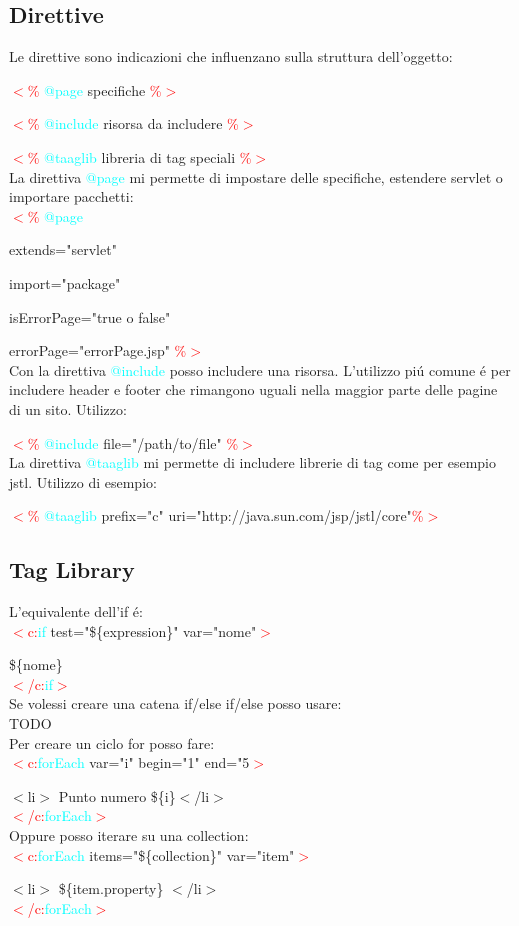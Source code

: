 \documentclass[11pt, letterpaper, titlepage]{article}
\newcommand{\openab}{\textcolor{red}{$<$\%} }
\newcommand{\closeab}{\textcolor{red}{\%$>$} }
\newcommand{\opencb}[1]{\textcolor{red}{$<$c:}\textcolor{cyan}{#1} }
\newcommand{\closecb}{\textcolor{red}{$>$}}
\newcommand{\closect}[1]{\textcolor{red}{$<$/c:}\textcolor{cyan}{#1}\textcolor{red}{$>$}}
\begin{document}
\subsection{Direttive}
Le direttive sono indicazioni che influenzano sulla struttura dell'oggetto:\par
\openab\textcolor{cyan}{@page} specifiche \closeab\par
\openab\textcolor{cyan}{@include} risorsa da includere \closeab \par
\openab\textcolor{cyan}{@taaglib} libreria di tag speciali \closeab \\
La direttiva \textcolor{cyan}{@page} mi permette di impostare delle specifiche, estendere
servlet o importare pacchetti:\\
\openab\textcolor{cyan}{@page}\par
extends="servlet"\par
import="package"\par
isErrorPage="true o false"\par
errorPage="errorPage.jsp" \closeab\\
Con la direttiva \textcolor{cyan}{@include} posso includere una risorsa. L'utilizzo pi\'u
comune \'e per includere header e footer che rimangono uguali nella maggior parte delle
pagine di un sito. Utilizzo:\par
\openab\textcolor{cyan}{@include} file="/path/to/file" \closeab \\
La direttiva \textcolor{cyan}{@taaglib} mi permette di includere librerie di tag come per
esempio jstl. Utilizzo di esempio:\par
\openab\textcolor{cyan}{@taaglib} prefix="c" uri="http://java.sun.com/jsp/jstl/core"\closeab

\subsection{Tag Library}
L'equivalente dell'if \'e:\\
\opencb{if}test="\$\{expression\}" var="nome"\closecb\par
\$\{nome\}\\
\closect{if}\\
Se volessi creare una catena if/else if/else posso usare:\\
TODO\\
Per creare un ciclo for posso fare:\\
\opencb{forEach}var="i" begin="1" end="5\closecb\par
$<$li$>$ Punto numero \$\{i\}$<$/li$>$\\
\closect{forEach}\\
Oppure posso iterare su una collection:\\
\opencb{forEach}items="\$\{collection\}" var="item"\closecb\par
$<$li$>$ \$\{item.property\} $<$/li$>$\\
\closect{forEach}
\end{document}
